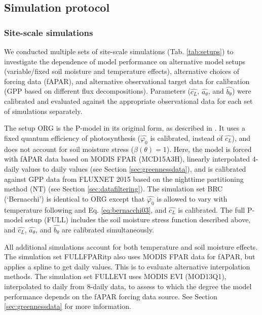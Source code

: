 \documentclass[gmd, manuscript]{copernicus}
\begin{document}
\subsection{Simulation protocol}
\label{sec:protocol}

\subsubsection{Site-scale simulations}

We conducted multiple sets of site-scale simulations (Tab. \ref{tab:setups}) to investigate the dependence of model performance on alternative model setups (variable/fixed soil moisture and temperature effects), alternative choices of forcing data (fAPAR), and alternative observational target data for calibration (GPP based on different flux decompositions). Parameters ($\widehat{c_L}$, $\widehat{a_{\theta}}$, and $\widehat{b_{\theta}}$) were calibrated and evaluated against the appropriate observational data for each set of simulations separately. 

The setup ORG is the P-model in its original form, as described in \citet{wang17natpl}. It uses a fixed quantum efficiency of photosynthesis ($\widehat{\varphi_0}$ is calibrated, instead of $\widehat{c_L}$), and does not account for soil moisture stress ($\beta (\theta)=1$). Here, the model is forced with fAPAR data based on MODIS FPAR (MCD15A3H), linearly interpolated 4-daily values to daily values (see Section \ref{sec:greennessdata}), and is calibrated against GPP data from FLUXNET 2015 based on the nighttime partitioning method (NT) (see Section \ref{sec:datafiltering}). The simulation set BRC (`Bernacchi') is identical to ORG except that  $\widehat{\varphi_0}$ is allowed to vary with temperature following \citet{bernacchi03pce} and Eq. \ref{eq:bernacchi03}, and $\widehat{c_L}$ is calibrated. The full P-model setup (FULL) includes the soil moisture stress function described above, and $\widehat{c_L}$, $\widehat{a_{\theta}}$, and $\widehat{b_{\theta}}$ are calibrated simultaneously. 

All additional simulations account for both temperature and soil moisture effects. The simulation set FULL\textunderscore FPARitp also uses MODIS FPAR data for fAPAR, but applies a spline to get daily values. This is to evaluate alternative interpolation methods. The simulation set FULL\textunderscore EVI uses MODIS EVI (MOD13Q1), interpolated to daily from 8-daily data, to assess to which the degree the model performance depends on the fAPAR forcing data source. See Section \ref{sec:greennessdata} for more information.
\end{document}
